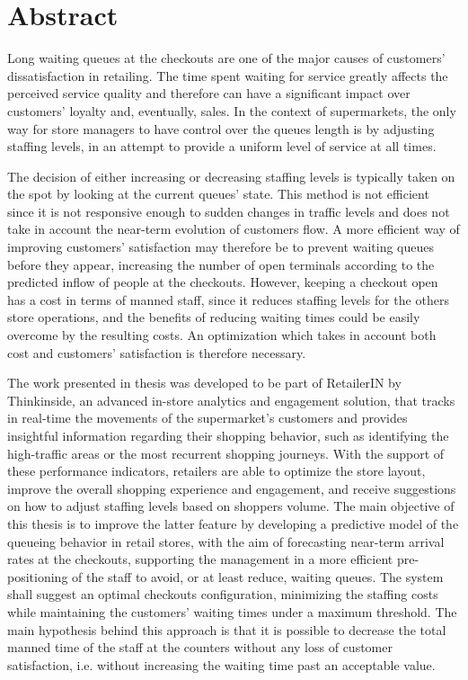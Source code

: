 \chapter*{Abstract}
\label{cha:abstract}


Long waiting queues at the checkouts are one of the major causes of customers’ dissatisfaction in retailing. The time spent waiting for service greatly affects the perceived service quality and therefore can have a significant impact over customers’ loyalty and, eventually, sales. In the context of supermarkets, the only way for store managers to have control over the queues length is by adjusting staffing levels, in an attempt to provide a uniform level of service at all times.

The decision of either increasing or decreasing staffing levels is typically taken on the spot by looking at the current queues’ state. This method is not efficient since it is not responsive enough to sudden changes in traffic levels  and does not take in account the near-term evolution of customers flow. A more efficient way of improving customers’ satisfaction may therefore be to prevent waiting queues before they appear, increasing the number of open terminals according to the predicted inflow of people at the checkouts. However, keeping a checkout open has a cost in terms of manned staff, since it reduces staffing levels for the others store operations, and the benefits of reducing waiting times could be easily overcome by the resulting costs. An optimization which takes in account both cost and customers’ satisfaction is therefore necessary.

The work presented in thesis was developed to be part of RetailerIN by Thinkinside, an advanced in-store analytics and engagement solution, that tracks in real-time the movements of the supermarket’s customers and provides insightful information regarding their shopping behavior, such as identifying the high-traffic areas or the most recurrent shopping journeys. With the support of these performance indicators, retailers are able to optimize the store layout, improve the overall shopping experience and engagement, and receive suggestions on how to adjust staffing levels based on shoppers volume. The main objective of this thesis is to improve the latter feature by developing a predictive model of the queueing behavior in retail stores, with the aim of forecasting near-term arrival rates at the checkouts, supporting the management in a more efficient pre-positioning of the staff to avoid, or at least reduce, waiting queues. The system shall suggest an optimal checkouts configuration, minimizing the staffing costs while maintaining the customers’ waiting times under a maximum threshold. The main hypothesis behind this approach is that it is possible to decrease the total manned time of the staff at the counters without any loss of customer satisfaction, i.e. without increasing the waiting time past an acceptable value.

